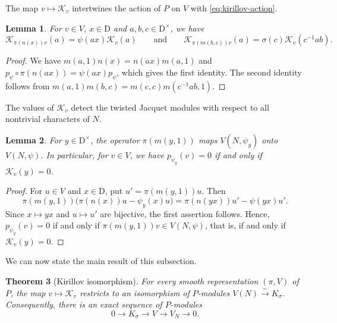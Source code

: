 \documentclass[11pt]{amsart}
\numberwithin{equation}{section}
\theoremstyle{plain}
\newtheorem{theorem}{Theorem}[section]
\newtheorem{lemma}[theorem]{Lemma}
\theoremstyle{definition}
\theoremstyle{remark}
\newcommand{\Kir}{\mathcal{K}}
\begin{document}
The map $v\mapsto\Kir_v$ intertwines the action of $P$ on $V$ with \eqref{eq:kirillov-action}.

\begin{lemma}\label{lem:kirillov-equiv}
	For $v\in V$, $x\in \mathrm{D}$ and $a,b,c\in \mathrm{D}^\times$, we have
	$$\Kir_{\pi(n(x))v}(a)=\psi(ax)\Kir_v(a)\qquad\text{and}\qquad\Kir_{\pi(m(b,c))v}(a)=\sigma(c)\Kir_v(c^{-1}ab).$$
\end{lemma}

\begin{proof}
	We have $m(a,1)n(x)=n(ax)m(a,1)$ and $p_\psi\circ\pi(n(ax))=\psi(ax)p_\psi$, which gives the first identity. The second identity follows from $m(a,1)m(b,c)=m(c,c)m(c^{-1}ab,1)$.
\end{proof}

The values of $\Kir_v$ detect the twisted Jacquet modules with respect to all nontrivial characters of $N$.

\begin{lemma}\label{lem:kirillov-zero}
	For $y\in \mathrm{D}^\times$, the operator $\pi(m(y,1))$ maps $V(N,\psi_y)$ onto $V(N,\psi)$. In particular, for $v\in V$, we have $p_{\psi_y}(v)=0$ if and only if $\Kir_v(y)=0$.
\end{lemma}

\begin{proof}
	For $u\in V$ and $x\in\mathrm{D}$, put $u'=\pi(m(y,1))u$. Then
	$$\pi(m(y,1))\big(\pi(n(x))u-\psi_y(x)u\big)=\pi(n(yx))u'-\psi(yx)u'.$$
	Since $x\mapsto yx$ and $u\mapsto u'$ are bijective, the first assertion follows. Hence, $p_{\psi_y}(v)=0$ if and only if $\pi(m(y,1))v\in V(N,\psi)$, that is, if and only if $\Kir_v(y)=0$.
\end{proof}

We can now state the main result of this subsection.

\begin{theorem}[Kirillov isomorphism]\label{thm:kirillov}
	For every smooth representation $(\pi,V)$ of $P$, the map $v\mapsto\Kir_v$ restricts to an isomorphism of $P$-modules $V(N)\xrightarrow{\sim}K_\sigma$. Consequently, there is an exact sequence of $P$-modules
	$$0\to K_\sigma\to V\to V_N\to0.$$
\end{theorem}
\end{document}
